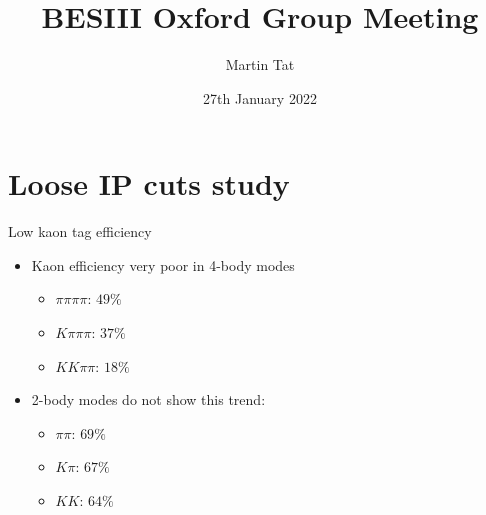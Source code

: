 \documentclass{beamer}
\title[BESIII Oxford]{BESIII Oxford Group Meeting}
\author{Martin Tat}
\institute{Oxford LHCb}
\date{27th January 2022}
\begin{document}
\begin{frame}
  \titlepage
\end{frame}


\section{Loose IP cuts study}

\begin{frame}{Low kaon tag efficiency}
  \begin{itemize}
    \setlength\itemsep{1.5em}
    \item{Kaon efficiency very poor in 4-body modes}
    \begin{itemize}
      \item{$\pi\pi\pi\pi$: $49\%$}
      \item{$K\pi\pi\pi$: $37\%$}
      \item{$KK\pi\pi$: $18\%$}
    \end{itemize}
    \item{2-body modes do not show this trend:}
    \begin{itemize}
      \item{$\pi\pi$: $69\%$}
      \item{$K\pi$: $67\%$}
      \item{$KK$: $64\%$}
    \end{itemize}
  \end{itemize}
\end{frame}
\end{document}
